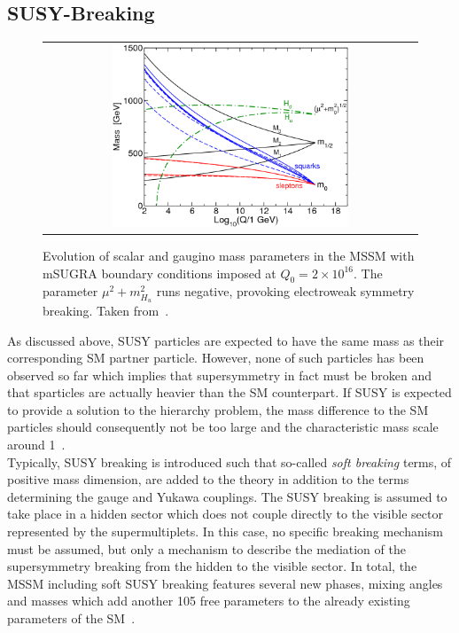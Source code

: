 \subsection{SUSY-Breaking}
\label{subsec:susy_breaking}
\begin{figure}[!tp]
  \centering 
  \begin{tabular}{c}
    \includegraphics[width=0.65\textwidth]{figures/MSSMrun.png}
  \end{tabular}
  \caption{Evolution of scalar and gaugino mass parameters in the MSSM with mSUGRA boundary conditions imposed at $Q_0 = 2 \times 10^{16}$\gev. The parameter $\mu^2 + m^2_{H_{u}}$ runs negative, provoking electroweak symmetry breaking. Taken from~\cite{Martin:1997ns}.}
  \label{fig:MSSMrun}
\end{figure}
As discussed above, SUSY particles are expected to have the same mass as their corresponding SM partner particle. However, none of such particles has been observed so far which implies that supersymmetry in fact must be broken and that sparticles are actually heavier than the SM counterpart. If SUSY is expected to provide a solution to the hierarchy problem, the mass difference to the SM particles should consequently not be too large and the characteristic mass scale around 1\tev~\cite{Martin:1997ns}. \\
Typically, SUSY breaking is introduced such that so-called \textit{soft breaking} terms, \ie of positive mass dimension, are added to the theory in addition to the terms determining the gauge and Yukawa couplings. The SUSY breaking is assumed to take place in a hidden sector which does not couple directly to the visible sector represented by the supermultiplets. In this case, no specific breaking mechanism must be assumed, but only a mechanism to describe the mediation of the supersymmetry breaking from the hidden to the visible sector. In total, the MSSM including soft SUSY breaking features several new phases, mixing angles and masses which add another 105 free parameters to the already existing parameters of the SM~\cite{Dimopoulos:1995ju}.  \\
